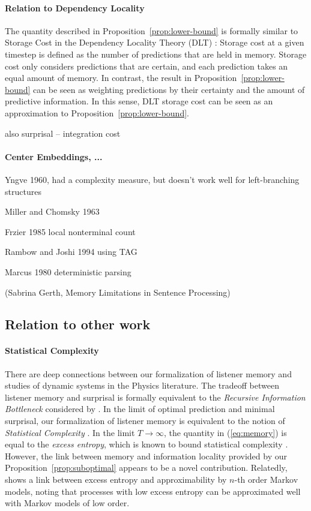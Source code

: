 \documentclass[11pt,letterpaper]{article}
\begin{document}
\paragraph{Relation to Dependency Locality}
The quantity described in Proposition~\ref{prop:lower-bound} is formally similar to Storage Cost in the Dependency Locality Theory (DLT) \citep{gibson-linguistic-1998}: Storage cost at a given timestep is defined as the number of predictions that are held in memory.
Storage cost only considers predictions that are certain, and each prediction takes an equal amount of memory.
In contrast, the result in Proposition~\ref{prop:lower-bound} can be seen as weighting predictions by their certainty and the amount of predictive information.
In this sense, DLT storage cost can be seen as an approximation to Proposition~\ref{prop:lower-bound}.

also surprisal -- integration cost


\paragraph{Center Embeddings, ...}
Yngve 1960, had a complexity measure, but doesn't work well for left-branching structures

Miller and Chomsky 1963

Frzier 1985 local nonterminal count

Rambow and Joshi 1994 using TAG

Marcus 1980 deterministic parsing

(Sabrina Gerth, Memory Limitations in Sentence Processing)


\subsection{Relation to other work}

\paragraph{Statistical Complexity}
There are deep connections between our formalization of listener memory and studies of dynamic systems in the Physics literature.
The tradeoff between listener memory and surprisal is formally equivalent to the \emph{Recursive Information Bottleneck} considered by \cite{still-information-2014}.
In the limit of optimal prediction and minimal surprisal, our formalization of listener memory is equivalent to the notion of \emph{Statistical Complexity} \citep{crutchfield-inferring-1989}.
In the limit $T \rightarrow \infty$, the quantity in (\ref{eq:memory}) is equal to the \emph{excess entropy}, which is known to bound statistical complexity \citep{crutchfield-inferring-1989}.
However, the link between memory and information locality provided by our Proposition~\ref{prop:suboptimal} appears to be a novel contribution.
Relatedly, \cite{sharan-prediction-2016} shows a link between excess entropy and approximability by $n$-th order Markov models, noting that processes with low excess entropy can be approximated well with Markov models of low order.
\end{document}
